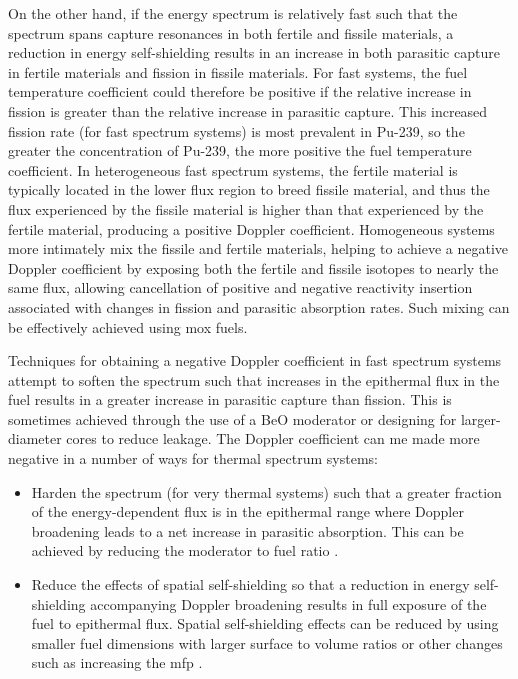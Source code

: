 On the other hand, if the energy spectrum is relatively fast such that the spectrum spans capture resonances in both fertile and fissile materials, a reduction in energy self-shielding results in an increase in both parasitic capture in fertile materials and fission in fissile materials. For fast systems, the fuel temperature coefficient could therefore be positive if the relative increase in fission is greater than the relative increase in parasitic capture. This increased fission rate (for fast spectrum systems) is most prevalent in Pu-239, so the greater the concentration of Pu-239, the more positive the fuel temperature coefficient. In heterogeneous fast spectrum systems, the fertile material is typically located in the lower flux region to breed fissile material, and thus the flux experienced by the fissile material is higher than that experienced by the fertile material, producing a positive Doppler coefficient. Homogeneous systems more intimately mix the fissile and fertile materials, helping to achieve a negative Doppler coefficient by exposing both the fertile and fissile isotopes to nearly the same flux, allowing cancellation of positive and negative reactivity insertion associated with changes in fission and parasitic absorption rates. Such mixing can be effectively achieved using \gls{mox} fuels. 

Techniques for obtaining a negative Doppler coefficient in fast spectrum systems attempt to soften the spectrum such that increases in the epithermal flux in the fuel results in a greater increase in parasitic capture than fission. This is sometimes achieved through the use of a BeO moderator or designing for larger-diameter cores to reduce leakage. The Doppler coefficient can me made more negative in a number of ways for thermal spectrum systems:

\begin{itemize}
\item Harden the spectrum (for very thermal systems) such that a greater fraction of the energy-dependent flux is in the epithermal range where Doppler broadening leads to a net increase in parasitic absorption. This can be achieved by reducing the moderator to fuel ratio \cite{fratoni}.
\item Reduce the effects of spatial self-shielding so that a reduction in energy self-shielding accompanying Doppler broadening results in full exposure of the fuel to epithermal flux. Spatial self-shielding effects can be reduced by using smaller fuel dimensions with larger surface to volume ratios \cite{fratoni} or other changes such as increasing the \gls{mfp} \cite{duderstadt}.
\end{itemize}

